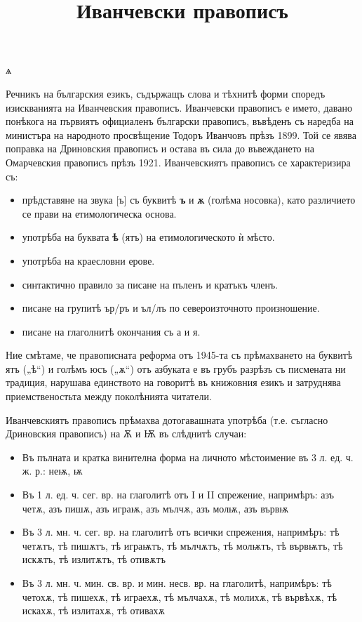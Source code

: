 \documentclass{article}
\begin{document}
	\title{Иванчевски правописъ}
\maketitle

ѧ

Речникъ на българския езикъ, съдържащъ слова и тѣхнитѣ форми споредъ изискванията на Иванчевския правописъ. 
Иванчевски правописъ е името, давано понѣкога на първиятъ официаленъ български правописъ, 
въвѣденъ съ наредба на министъра на народното просвѣщение Тодоръ Иванчовъ прѣзъ 1899.
Той се явява поправка на Дриновския правописъ и остава въ сила до въвеждането на Омарчевския правописъ прѣзъ 1921. 
Иванчевскиятъ правописъ се характеризира съ:
%
\begin{itemize}
	\item прѣдставяне на звука [ъ] съ буквитѣ \textbf{ъ} и \textbf{ѫ} (голѣма носовка), като различието се прави на етимологическа основа.
	\item употрѣба на буквата \textbf{ѣ} (ятъ) на етимологическото ѝ мѣсто.
	\item употрѣба на краесловни ерове.
	\item синтактично правило за писане на пъленъ и кратъкъ членъ.
	\item писане на групитѣ ър/ръ и ъл/лъ по североизточното произношение.
	\item писане на глаголнитѣ окончания съ а и я.
\end{itemize}


Ние смѣтаме, че правописната реформа отъ 1945-та съ прѣмахването на буквитѣ ятъ („ѣ“) и голѣмъ юсъ („ѫ“) отъ азбуката е въ грубъ разрѣзъ съ писмената ни традиция, нарушава единството на говоритѣ въ книжовния езикъ и затруднява приемственостьта между поколѣнията читатели.

Иванчевскиятъ правописъ прѣмахва дотогавашната употрѣба (т.е. съгласно Дриновския правописъ) на Ѫ и Ѭ въ слѣднитѣ случаи:

\begin{itemize}
	\item Въ пълната и кратка винителна форма на личното мѣстоимение въ 3 л. ед. ч. ж. р.: неѭ, ѭ
	
	\item Въ 1 л. ед. ч. сег. вр. на глаголитѣ отъ I и II спрежение, напримѣръ: азъ четѫ, азъ пишѫ, азъ играѭ, азъ мълчѫ, азъ молѭ, азъ вървѭ
	
	\item Въ 3 л. мн. ч. сег. вр. на глаголитѣ отъ всички спрежения, напримѣръ: тѣ четѫтъ, тѣ пишѫтъ, тѣ играѭтъ, тѣ мълчѫтъ, тѣ молѭтъ, тѣ вървѭтъ, тѣ искѫтъ, тѣ излитѫтъ, тѣ отивѫтъ
	
	\item Въ 3 л. мн. ч. мин. св. вр. и мин. несв. вр. на глаголитѣ, напримѣръ: тѣ четохѫ, тѣ пишехѫ, тѣ играехѫ, тѣ мълчахѫ, тѣ молихѫ, тѣ вървѣхѫ, тѣ искахѫ, тѣ излитахѫ, тѣ отивахѫ
\end{itemize}

 
\end{document}
